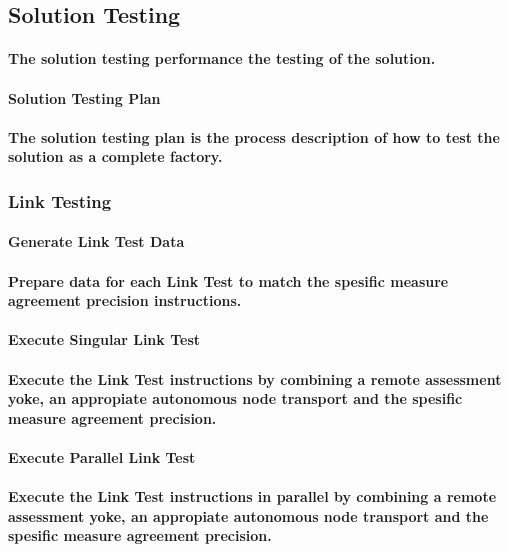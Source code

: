 \documentclass{acm_proc_article-sp}
\begin{document}
\subsection{Solution Testing}
\paragraph{The solution testing performance the testing of the solution.}
\paragraph{Solution Testing Plan}
\paragraph{The solution testing plan is the process description of how to test the solution as a complete factory.}
\subsubsection{Link Testing}
\paragraph{Generate Link Test Data}
\paragraph{Prepare data for each Link Test to match the spesific measure agreement precision instructions.}
\paragraph{Execute Singular Link Test}
\paragraph{Execute the Link Test instructions by combining a remote assessment yoke, an appropiate autonomous node transport and the spesific measure agreement precision.}
\paragraph{Execute Parallel Link Test}
\paragraph{Execute the Link Test instructions in parallel by combining a remote assessment yoke, an appropiate autonomous node transport and the spesific measure agreement precision.}
\end{document}
